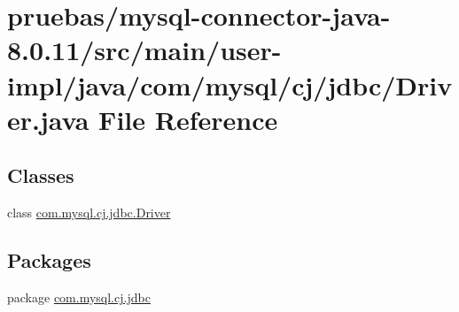 \hypertarget{main_2user-impl_2java_2com_2mysql_2cj_2jdbc_2_driver_8java}{}\section{pruebas/mysql-\/connector-\/java-\/8.0.11/src/main/user-\/impl/java/com/mysql/cj/jdbc/\+Driver.java File Reference}
\label{main_2user-impl_2java_2com_2mysql_2cj_2jdbc_2_driver_8java}
\subsection*{Classes}
\begin{DoxyCompactItemize}
\item 
class \mbox{\hyperlink{classcom_1_1mysql_1_1cj_1_1jdbc_1_1_driver}{com.\+mysql.\+cj.\+jdbc.\+Driver}}
\end{DoxyCompactItemize}
\subsection*{Packages}
\begin{DoxyCompactItemize}
\item 
package \mbox{\hyperlink{namespacecom_1_1mysql_1_1cj_1_1jdbc}{com.\+mysql.\+cj.\+jdbc}}
\end{DoxyCompactItemize}

